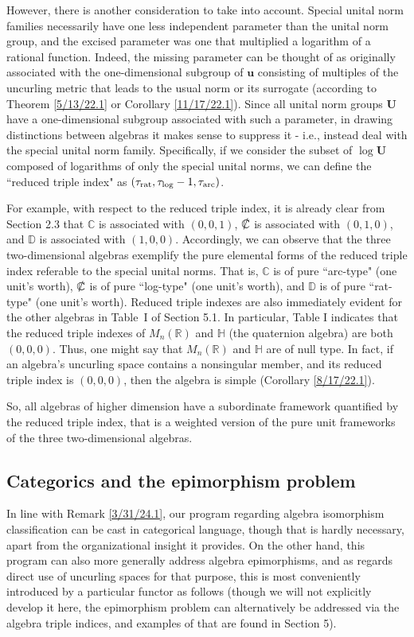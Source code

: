 \documentclass{amsart}
\numberwithin{equation}{section}
\theoremstyle{definition}
\numberwithin{theorem}{section}
\begin{document}
However, there is another consideration to take into account. Special unital norm families necessarily have one less independent parameter than the unital norm group, and the excised parameter was one that multiplied a logarithm of a rational function.  Indeed, the missing parameter can be thought of as originally associated with the one-dimensional subgroup of $\mathbf{u}$ consisting of multiples of the uncurling metric that leads to the usual norm or its surrogate (according to Theorem \ref{5/13/22.1} or Corollary \ref{11/17/22.1}).  Since all unital norm groups $\mathbf{U}$ have a one-dimensional subgroup associated with such a parameter, in drawing distinctions between algebras it makes sense to suppress it - i.e., instead deal with the special unital norm family.  Specifically, if we consider the subset of $\log \mathbf{U}$ composed of logarithms of only the special unital norms, we can define the ``reduced triple index" as $(\tau_{\rm rat},\tau_{\rm log}-1,\tau_{\rm arc})$.
 
For example, with respect to the reduced triple index, it is already clear from Section 2.3 that $\mathbb{C}$ is associated with $(0,0,1)$, $\slashed{\mathbb{C}}$ is associated with $(0,1,0)$, and $\mathbb{D}$ is associated with $(1,0,0)$.  Accordingly, we can observe that the three \mbox{two-dimensional} algebras exemplify the pure elemental forms of the reduced triple index referable to the special unital norms.  That is, $\mathbb{C}$ is of pure ``arc-type" (one unit's worth), $\slashed{\mathbb{C}}$ is of pure ``log-type" (one unit's worth), and $\mathbb{D}$ is of pure ``rat-type" (one unit's worth).  Reduced triple indexes are also immediately evident for the other algebras in \mbox{Table I} of Section 5.1.  In particular, Table I indicates that the reduced triple indexes of $M_n(\mathbb{R})$ and $\mathbb{H}$ (the quaternion algebra) are both $(0,0,0)$.  
 Thus, one might say that $M_n(\mathbb{R})$ and $\mathbb{H}$ are of null type.  In fact, if an algebra's uncurling space contains a nonsingular member, and its reduced triple index is $(0,0,0)$, then the algebra is simple (Corollary \ref{8/17/22.1}). 
 
 So, all algebras of higher dimension have a subordinate framework quantified by the reduced triple index, that is a weighted version of the pure unit frameworks of the three two-dimensional algebras.

\subsection{Categorics and the epimorphism problem}
 In line with Remark \ref{3/31/24.1}, our program regarding algebra isomorphism classification can be cast in categorical language, though that is hardly necessary, apart from the organizational insight it provides. 
On the other hand, this program can also more generally address algebra epimorphisms, and as regards direct use of uncurling spaces for that purpose, this is most conveniently introduced by a particular functor as follows (though we will not explicitly develop it here, the epimorphism problem can alternatively be addressed via the algebra triple indices, and examples of that are found in Section 5).  
\end{document}
